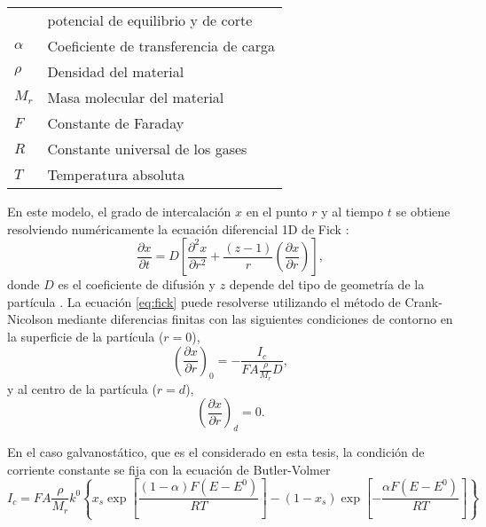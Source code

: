 \begin{table}[h!]
{\begin{tabular}{l l}
                                     & potencial de equilibrio y de corte \\
        $\alpha$ & Coeficiente de transferencia de carga \\
        $\rho$ & Densidad del material \\
        $M_r$ & Masa molecular del material \\
        $F$ & Constante de Faraday \\
        $R$ & Constante universal de los gases \\
        $T$ & Temperatura absoluta \\
        \bottomrule
    \end{tabular}
    }{}
    \label{t:params}
\end{table}

En este modelo, el grado de intercalación $x$ en el punto $r$ y al tiempo $t$ se 
obtiene resolviendo numéricamente la ecuación diferencial 1D de Fick \cite{bard-electrochemistry}:
\begin{equation}\label{eq:fick}
    \frac{\partial x}{\partial t} = D \left[ \frac{\partial^2 x}{\partial r^2} + \frac{(z - 1)}{r} \left(\frac{\partial x}{\partial r}\right) \right],
\end{equation}
donde $D$ es el coeficiente de difusión y $z$ depende del tipo de geometría de la 
partícula \cite{vassiliev2016}. La ecuación \ref{eq:fick} puede resolverse 
utilizando el método de Crank-Nicolson mediante diferencias finitas 
\cite{crank-nicolson} con las siguientes condiciones de contorno en la superficie
de la partícula ($r = 0$),
\begin{equation}
    \left(\frac{\partial x}{\partial r}\right)_0 = - \frac{I_c}{F A \frac{\rho}{M_r}D},
\end{equation}
y al centro de la partícula ($r = d$),
\begin{equation}
    \left(\frac{\partial x}{\partial r}\right)_d = 0.
\end{equation}

En el caso galvanostático, que es el considerado en esta tesis, la condición de
corriente constante se fija con la ecuación de Butler-Volmer 
\cite{bard-electrochemistry}
\begin{equation}\label{eq:bv}
    I_c = F A \frac{\rho}{M_r} k^0 \left\{x_s \exp\left[ \frac{(1-\alpha)F(E-E^0)}{RT} \right] - (1 - x_s) \exp\left[ -\frac{\alpha F (E-E^0)}{RT} \right] \right\}
\end{equation}

